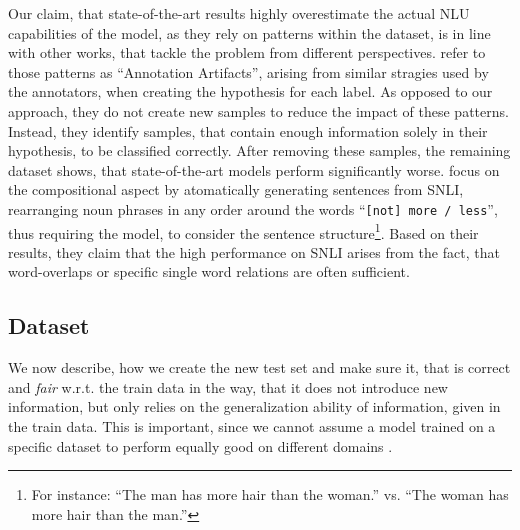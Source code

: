 Our claim, that state-of-the-art results highly overestimate the actual \ac{NLU} capabilities of the model, as they rely on patterns within the dataset, is in line with other works, that tackle the problem from different perspectives. \citep{gururangan2018annotation} refer to those patterns as ``Annotation Artifacts'', arising from similar stragies used by the annotators, when creating the hypothesis for each label. As opposed to our approach, they do not create new samples to reduce the impact of these patterns. Instead, they identify samples, that contain enough information solely in their hypothesis, to be classified correctly. After removing these samples, the remaining dataset shows, that state-of-the-art models perform significantly worse. \citep{dasgupta2018evaluating} focus on the compositional aspect by atomatically generating sentences from \ac{SNLI}, rearranging noun phrases in any order around the words ``\texttt{[not] more / less}'', thus requiring the model, to consider the sentence structure\footnote{For instance: ``The man has more hair than the woman.'' vs. ``The woman has more hair than the man.''}. Based on their results, they claim that the high performance on \ac{SNLI} arises from the fact, that word-overlaps or specific single word relations are often sufficient.

\subsection{Dataset}
We now describe, how we create the new test set and make sure it, that is correct and \textit{fair} w.r.t. the train data in the way, that it does not introduce new information, but only relies on the generalization ability of information, given in the train data. This is important, since we cannot assume a model trained on a specific dataset to perform equally good on different domains \citep{goldberg2017Apr}.
